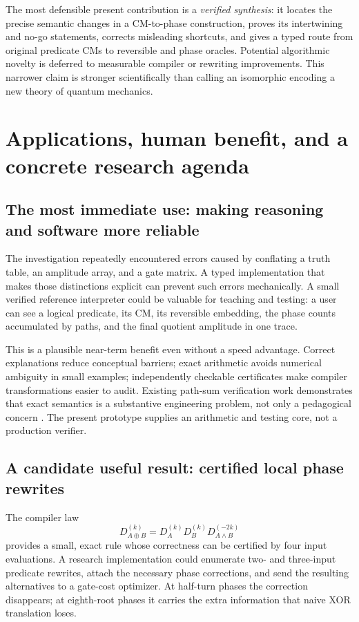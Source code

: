 The most defensible present contribution is a \emph{verified synthesis}: it locates the precise semantic changes in a CM-to-phase construction, proves its intertwining and no-go statements, corrects misleading shortcuts, and gives a typed route from original predicate CMs to reversible and phase oracles. Potential algorithmic novelty is deferred to measurable compiler or rewriting improvements. This narrower claim is stronger scientifically than calling an isomorphic encoding a new theory of quantum mechanics.

\section{Applications, human benefit, and a concrete research agenda}\label{sec:applications}
\subsection{The most immediate use: making reasoning and software more reliable}
The investigation repeatedly encountered errors caused by conflating a truth table, an amplitude array, and a gate matrix. A typed implementation that makes those distinctions explicit can prevent such errors mechanically. A small verified reference interpreter could be valuable for teaching and testing: a user can see a logical predicate, its CM, its reversible embedding, the phase counts accumulated by paths, and the final quotient amplitude in one trace.

This is a plausible near-term benefit even without a speed advantage. Correct explanations reduce conceptual barriers; exact arithmetic avoids numerical ambiguity in small examples; independently checkable certificates make compiler transformations easier to audit. Existing path-sum verification work demonstrates that exact semantics is a substantive engineering problem, not only a pedagogical concern \cite{amy2019,amy2023}. The present prototype supplies an arithmetic and testing core, not a production verifier.

\subsection{A candidate useful result: certified local phase rewrites}
The compiler law
\begin{equation}
 D_{A\oplus B}^{(k)}=D_A^{(k)}D_B^{(k)}D_{A\land B}^{(-2k)}
\end{equation}
provides a small, exact rule whose correctness can be certified by four input evaluations. A research implementation could enumerate two- and three-input predicate rewrites, attach the necessary phase corrections, and send the resulting alternatives to a gate-cost optimizer. At half-turn phases the correction disappears; at eighth-root phases it carries the extra information that naive XOR translation loses.

